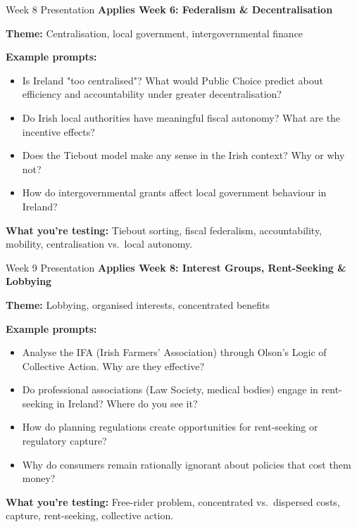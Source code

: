 \documentclass[10pt]{beamer}
\begin{document}
\begin{frame}{Week 8 Presentation}
\textbf{Applies Week 6: Federalism \& Decentralisation}

\textbf{Theme:} Centralisation, local government, intergovernmental finance

\textbf{Example prompts:}
\begin{itemize}
\item Is Ireland "too centralised"? What would Public Choice predict about efficiency and accountability under greater decentralisation?
\item Do Irish local authorities have meaningful fiscal autonomy? What are the incentive effects?
\item Does the Tiebout model make any sense in the Irish context? Why or why not?
\item How do intergovernmental grants affect local government behaviour in Ireland?
\end{itemize}

\textbf{What you're testing:} Tiebout sorting, fiscal federalism, accountability, mobility, centralisation vs.\ local autonomy.
\end{frame}

\begin{frame}{Week 9 Presentation}
\textbf{Applies Week 8: Interest Groups, Rent-Seeking \& Lobbying}

\textbf{Theme:} Lobbying, organised interests, concentrated benefits

\textbf{Example prompts:}
\begin{itemize}
\item Analyse the IFA (Irish Farmers' Association) through Olson's Logic of Collective Action. Why are they effective?
\item Do professional associations (Law Society, medical bodies) engage in rent-seeking in Ireland? Where do you see it?
\item How do planning regulations create opportunities for rent-seeking or regulatory capture?
\item Why do consumers remain rationally ignorant about policies that cost them money?
\end{itemize}

\textbf{What you're testing:} Free-rider problem, concentrated vs.\ dispersed costs, capture, rent-seeking, collective action.
\end{frame}
\end{document}
